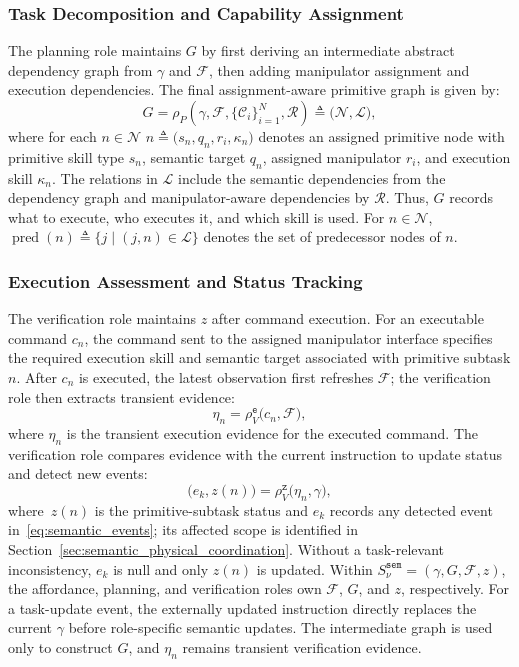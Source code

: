 \subsubsection{Task Decomposition and Capability Assignment}
The planning role maintains $G$ by first deriving an intermediate abstract
dependency graph from $\gamma$ and $\mathcal{F}$, then adding manipulator
assignment and execution dependencies. The final assignment-aware primitive
graph is given by:
\begin{equation}
 G=
 \rho_P\!\left(
 \gamma,\mathcal{F},\{\mathcal{C}_i\}_{i=1}^{N},\mathcal{R}\right)
\triangleq\bigl(\mathcal{N},\mathcal{L}\bigr),
 \label{eq:planning_pipeline}
\end{equation}
where for each $n\in\mathcal{N}$
$n\triangleq\bigl(s_n,q_n,r_i,\kappa_n\bigr)$ denotes an assigned primitive
node with primitive skill type $s_n$, semantic target $q_n$, assigned
manipulator $r_i$, and execution skill $\kappa_n$. The relations in
$\mathcal{L}$ include the semantic dependencies from the dependency graph
and manipulator-aware dependencies by $\mathcal{R}$.
Thus, $G$ records what to execute, who executes it, and which skill
is used. For $n\in\mathcal{N}$,
$\operatorname{pred}(n)\triangleq\{j\mid (j,n)\in\mathcal{L}\}$ denotes the set
of predecessor nodes of $n$.

\subsubsection{Execution Assessment and Status Tracking}
The verification role maintains $z$ after command execution. For an executable
command $c_n$, the command sent to the assigned manipulator interface specifies
the required execution skill and semantic target associated with primitive
subtask $n$. After $c_n$ is executed, the latest observation first refreshes
$\mathcal{F}$; the verification role then extracts transient evidence:
\begin{equation}
 \eta_n=\rho_V^{\texttt{e}}\bigl(c_n,\mathcal{F}\bigr),
 \label{eq:verification_evidence}
\end{equation}
where $\eta_n$ is the transient execution evidence for the executed command.
The verification role compares evidence with the current instruction to update
status and detect new events:
\begin{equation}
 \bigl(e_k,z(n)\bigr)=
 \rho_V^{\texttt{z}}\bigl(\eta_n,\gamma\bigr),
 \label{eq:verification_status}
\end{equation}
where~$z(n)$ is the primitive-subtask status and $e_k$ records any detected
event in~\eqref{eq:semantic_events}; its affected scope is identified in
Section~\ref{sec:semantic_physical_coordination}. Without a task-relevant
inconsistency, $e_k$ is null and only $z(n)$ is updated.
Within $S_\nu^{\texttt{sem}}=(\gamma,G,\mathcal{F},z)$, the affordance,
planning, and verification roles own $\mathcal{F}$, $G$, and $z$, respectively.
For a task-update event, the externally updated instruction directly replaces
the current $\gamma$ before role-specific semantic updates. The intermediate graph is used
only to construct $G$, and $\eta_n$ remains transient verification evidence.
